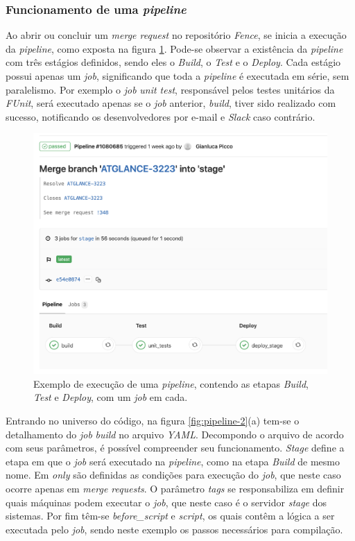 \hypertarget{funcionamento-de-uma-pipeline}{%
\subsubsection{\texorpdfstring{Funcionamento de uma \emph{pipeline}}{Funcionamento de uma pipeline}}\label{funcionamento-de-uma-pipeline}}

Ao abrir ou concluir um \emph{merge request} no repositório \emph{Fence}, se inicia a execução da \emph{pipeline}, como exposta na figura \ref{fig:pipeline}. Pode-se observar a existência da \emph{pipeline} com três estágios definidos, sendo eles o \emph{Build}, o \emph{Test} e o \emph{Deploy}. Cada estágio possui apenas um \emph{job}, significando que toda a \emph{pipeline} é executada em série, sem paralelismo. Por exemplo o \emph{job} \emph{unit test}, responsável pelos testes unitários da \emph{FUnit}, será executado apenas se o \emph{job} anterior, \emph{build}, tiver sido realizado com sucesso, notificando os desenvolvedores por e-mail e \emph{Slack} caso contrário.

\begin{figure}[H]
    \centering
    \includegraphics[width=13cm]{source/4-solucao/images/pipeline.png}
    \caption{Exemplo de execução de uma \emph{pipeline}, contendo as etapas \emph{Build}, \emph{Test} e \emph{Deploy}, com um \emph{job} em cada.}
    \label{fig:pipeline}
\end{figure}

Entrando no universo do código, na figura \ref{fig:pipeline-2}(a) tem-se o detalhamento do \emph{job} \emph{build} no arquivo \emph{YAML}. Decompondo o arquivo de acordo com seus parâmetros, é possível compreender seu funcionamento. \emph{Stage} define a etapa em que o \emph{job} será executado na \emph{pipeline}, como na etapa \emph{Build} de mesmo nome. Em \emph{only} são definidas as condições para execução do \emph{job}, que neste caso ocorre apenas em \emph{merge requests}. O parâmetro \emph{tags} se responsabiliza em definir quais máquinas podem executar o \emph{job}, que neste caso é o servidor \emph{stage} dos sistemas. Por fim têm-se \emph{before\_script} e \emph{script}, os quais contêm a lógica a ser executada pelo \emph{job}, sendo neste exemplo os passos necessários para compilação.

